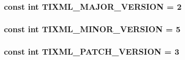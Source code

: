 \subsubsection[TIXML\_\-MAJOR\_\-VERSION]{\setlength{\rightskip}{0pt plus 5cm}const int {\bf TIXML\_\-MAJOR\_\-VERSION} = 2}\label{tinyxml_8h_3b0c714c9be8a776d5d02c5d80e56f34}


\subsubsection[TIXML\_\-MINOR\_\-VERSION]{\setlength{\rightskip}{0pt plus 5cm}const int {\bf TIXML\_\-MINOR\_\-VERSION} = 5}\label{tinyxml_8h_4c9cab500d81e6741e23d5087b029764}


\subsubsection[TIXML\_\-PATCH\_\-VERSION]{\setlength{\rightskip}{0pt plus 5cm}const int {\bf TIXML\_\-PATCH\_\-VERSION} = 3}\label{tinyxml_8h_2413aed779b03d5768157b299ff79090}



